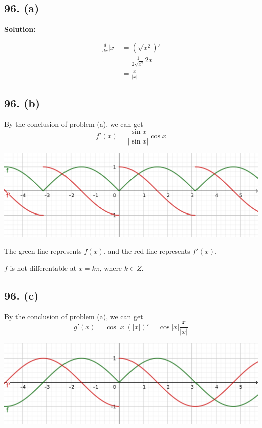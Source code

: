 \documentclass{article}
\newenvironment{solution}{
    \par \textbf{Solution: } \quad \par
}{\par}
\begin{document}
    \subsection*{96. (a)}

    \begin{solution}
        $$\begin{aligned}
            \frac{d}{dx}|x| &= (\sqrt{x^2})' \\
            &= \frac{1}{2\sqrt{x^2}} 2x \\
            &= \frac{x}{|x|}
        \end{aligned}$$
    \end{solution}

    \subsection*{96. (b)}

    By the conclusion of problem (a), we can get $$f'(x) = \frac{\sin x}{|\sin x|} \cos x$$

    \includegraphics{96b.png}

    The green line represents $f(x)$, and the red line represents $f'(x)$.

    $f$ is not differentable at $x = k\pi$, where $k \in Z$.
    
    \subsection*{96. (c)}

    By the conclusion of problem (a), we can get $$g'(x) = \cos|x| (|x|)' = \cos|x| \frac{x}{|x|}$$
    
    \includegraphics{96c.png}
\end{document}
